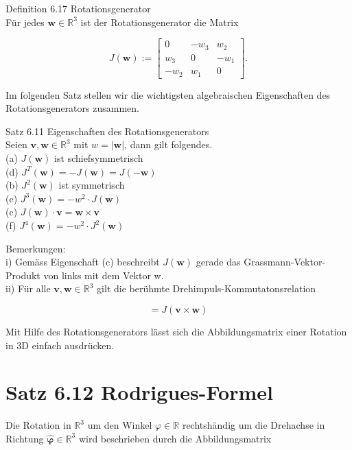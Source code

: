 \documentclass[10pt]{article}
\begin{document}
Definition 6.17 Rotationsgenerator\\
Für jedes $\mathbf{w} \in \mathbb{R}^{3}$ ist der Rotationsgenerator die Matrix

\[
J(\mathbf{w}):=\left[\begin{array}{ccc}
0 & -w_{3} & w_{2}  \tag{6.82}\\
w_{3} & 0 & -w_{1} \\
-w_{2} & w_{1} & 0
\end{array}\right] .
\]

Im folgenden Satz stellen wir die wichtigsten algebraischen Eigenschaften des Rotationsgenerators zusammen.

Satz 6.11 Eigenschaften des Rotationsgenerators\\
Seien $\mathbf{v}, \mathbf{w} \in \mathbb{R}^{3}$ mit $w=|\mathbf{w}|$, dann gilt folgendes.\\
(a) $J(\mathbf{w})$ ist schiefsymmetrisch\\
(d) $J^{T}(\mathbf{w})=-J(\mathbf{w})=J(-\mathbf{w})$\\
(b) $J^{2}(\mathbf{w})$ ist symmetrisch\\
(e) $J^{3}(\mathbf{w})=-w^{2} \cdot J(\mathbf{w})$\\
(c) $J(\mathbf{w}) \cdot \mathbf{v}=\mathbf{w} \times \mathbf{v}$\\
(f) $J^{4}(\mathbf{w})=-w^{2} \cdot J^{2}(\mathbf{w})$

Bemerkungen:\\
i) Gemäss Eigenschaft (c) beschreibt $J(\mathbf{w})$ gerade das Grassmann-Vektor-Produkt von links mit dem Vektor w.\\
ii) Für alle $\mathbf{v}, \mathbf{w} \in \mathbb{R}^{3}$ gilt die berühmte Drehimpuls-Kommutatonsrelation


\begin{equation*}
[J(\mathbf{v}), J(\mathbf{w})]=J(\mathbf{v} \times \mathbf{w}) \tag{6.83}
\end{equation*}


Mit Hilfe des Rotationsgenerators lässt sich die Abbildungsmatrix einer Rotation in 3D einfach ausdrücken.

\section*{Satz 6.12 Rodrigues-Formel}
Die Rotation in $\mathbb{R}^{3}$ um den Winkel $\varphi \in \mathbb{R}$ rechtshändig um die Drehachse in Richtung $\hat{\boldsymbol{\varphi}} \in \mathbb{R}^{3}$ wird beschrieben durch die Abbildungsmatrix
\end{document}
